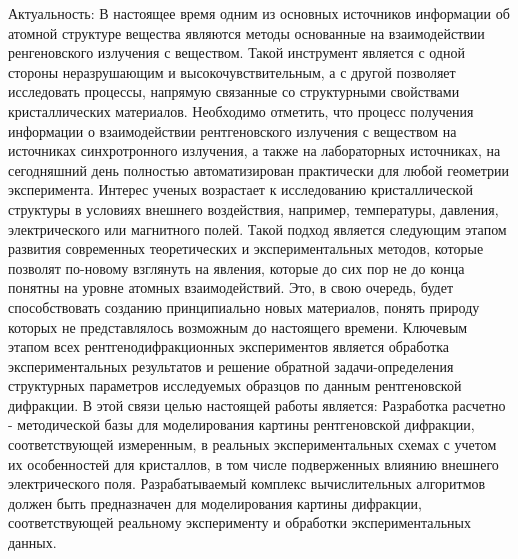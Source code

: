 
Актуальность:
  В настоящее время одним из основных источников информации об атомной структуре
  вещества являются методы основанные на взаимодействии ренгеновского излучения с веществом.
  Такой инструмент является с одной стороны неразрушающим и высокочувствительным,
   а с другой позволяет исследовать процессы, напрямую связанные со структурными
   свойствами кристаллических материалов. Необходимо отметить, что процесс
   получения информации о взаимодействии рентгеновского излучения с веществом на
   источниках синхротронного излучения, а также на лабораторных источниках, на
   сегодняшний день полностью автоматизирован практически для любой геометрии эксперимента.
    Интерес ученых возрастает к исследованию кристаллической структуры в условиях
     внешнего воздействия, например, температуры, давления, электрического или
     магнитного полей.  Такой подход является следующим этапом развития современных
     теоретических и экспериментальных методов, которые позволят по-новому взглянуть на
     явления, которые до сих пор не до конца понятны на уровне атомных взаимодействий.
      Это, в свою очередь, будет способствовать созданию принципиально новых материалов,
       понять природу которых не представлялось возможным до настоящего времени. Ключевым
       этапом всех рентгенодифракционных экспериментов является обработка экспериментальных
       результатов и решение обратной задачи-определения структурных параметров
       исследуемых образцов по данным рентгеновской дифракции. В этой связи целью
       настоящей работы является:
  Разработка расчетно - методической базы для моделирования картины рентгеновской
  дифракции, соответствующей измеренным, в реальных экспериментальных схемах
  с учетом их особенностей для кристаллов, в том числе подверженных влиянию
  внешнего электрического поля. Разрабатываемый комплекс вычислительных алгоритмов
  должен быть предназначен
  для моделирования картины дифракции, соответствующей реальному эксперименту
  и обработки экспериментальных данных.

